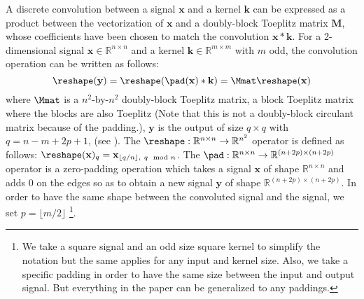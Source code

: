 A discrete convolution between a signal $\mathbf{x}$ and a kernel $\mathbf{k}$ can be expressed as a  product between the vectorization of $\mathbf{x}$ and a doubly-block Toeplitz matrix $\textbf{M}$, whose coefficients have been chosen to match the convolution $\mathbf{x} * \mathbf{k}$.
For a 2-dimensional signal $\mathbf{x} \in \mathbb{R}^{n \times n}$ and a kernel $\mathbf{k} \in \mathbb{R}^{m \times m}$ with $m$ odd, the convolution operation can be written as follows:
\begin{equation} \label{equation:equation_conv_as_matrix}
    \reshape(\mathbf{y}) = \reshape(\pad(\mathbf{x}) * \mathbf{k}) = \Mmat \reshape(\mathbf{x})
\end{equation}
where $\Mmat$ is a $n^2$-by-$n^2$  doubly-block Toeplitz matrix, \ie a block Toeplitz matrix where the blocks are also Toeplitz (Note that this is not a doubly-block circulant matrix because of the padding.), $\mathbf{y}$ is the output of size $q \times q$ with $q = n - m + 2p + 1$, (see \eg \cite{dumoulin2016guide}).
The $\reshape: \mathbb{R}^{n \times n} \rightarrow \mathbb{R}^{n^2}$ operator is defined as follows: $\reshape(\mathbf{x})_q = \mathbf{x}_{\lfloor q/n \rfloor,\ q\mod n}$.
The $\pad: \mathbb{R}^{n \times n} \rightarrow \mathbb{R}^{(n+2p) \times (n+2p)}$ operator is a zero-padding operation which takes a signal $\mathbf{x}$ of shape $\mathbb{R}^{n \times n}$ and adds $0$ on the edges so as to obtain a new signal $\mathbf{y}$ of shape $\mathbb{R}^{(n+2p) \times (n+2p)}$.
In order to have the same shape between the convoluted signal and the signal, we set $ p = \lfloor m/2 \rfloor$ \footnote{We take a square signal and an odd size square kernel to simplify the notation but the same applies for any input and kernel size.
Also, we take a specific padding in order to have the same size between the input and output signal.
But everything in the paper can be generalized to any paddings.}.

